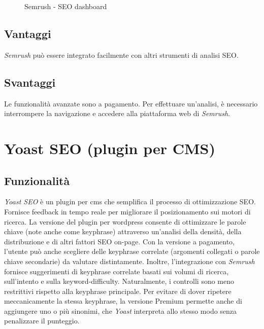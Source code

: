 \begin{figure}[H] 
    \centering 
    \caption{Semrush - SEO dashboard}
\end{figure}

\subsection{Vantaggi}
\par \textit{Semrush} può essere integrato facilmente con altri strumenti di analisi SEO.

\subsection{Svantaggi}
\par Le funzionalità avanzate sono a pagamento. Per effettuare un'analisi, è necessario interrompere la navigazione e accedere alla piattaforma web di \textit{Semrush}.

\section{Yoast SEO (plugin per CMS)}

\subsection{Funzionalità}
\par \textit{Yoast SEO} è un plugin per \gls{cms} che semplifica il processo di ottimizzazione SEO. Fornisce feedback in tempo reale per migliorare il posizionamento sui motori di ricerca. La versione del plugin per \gls{wordpress} consente di ottimizzare le parole chiave (note anche come keyphrase) attraverso un'analisi della densità, della distribuzione e di altri fattori SEO \gls{on-page}. Con la versione a pagamento, l'utente può anche scegliere delle keyphrase correlate (argomenti collegati o parole chiave secondarie) da valutare distintamente. Inoltre, l'integrazione con \textit{Semrush} fornisce suggerimenti di keyphrase correlate basati sui volumi di ricerca, sull'intento e sulla \gls{keyword-difficulty}. Naturalmente, i controlli sono meno restrittivi rispetto alla keyphrase principale. Per evitare di dover ripetere meccanicamente la stessa keyphrase, la versione Premium permette anche di aggiungere uno o più sinonimi, che \textit{Yoast} interpreta allo stesso modo senza penalizzare il punteggio.

